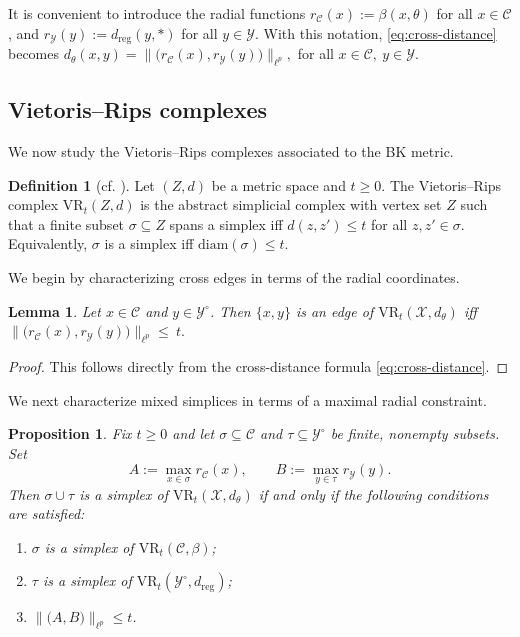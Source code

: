 \documentclass[11pt]{amsart}
\newtheorem{lemma}[theorem]{Lemma}
\newtheorem{proposition}[theorem]{Proposition}
\theoremstyle{definition}
\newtheorem{definition}[theorem]{Definition}
\theoremstyle{remark}
\newcommand{\1}{\mathbbm{1}}
\newcommand{\diam}{\mathrm{diam}}
\begin{document}
It is convenient to introduce the radial functions $r_{\mathcal C}(x):=\beta(x,\theta)$ for all $x\in\mathcal C$, and $r_{\mathcal Y}(y):=d_{\mathrm{reg}}(y,\ast)$ for all $y\in\mathcal Y.$ 
With this notation, \eqref{eq:cross-distance} becomes
$d_\theta(x,y)=\bigl\|\bigl(r_{\mathcal C}(x), r_{\mathcal Y}(y)\bigr)\bigr\|_{\ell^p},$ for all $ x\in\mathcal C,\ y\in\mathcal Y.$

\subsection{Vietoris--Rips complexes}
We now study the Vietoris--Rips complexes associated to the BK metric.
\begin{definition}[cf. {\cite{Hausmann}\cite{Gromov}}]
Let $(Z,d)$ be a metric space and $t\ge 0$.
The Vietoris--Rips complex $\mathrm{VR}_t(Z,d)$ is the abstract simplicial complex with vertex set $Z$
such that a finite subset $\sigma\subseteq Z$ spans a simplex iff $d(z,z')\le t$ for all $z,z'\in\sigma.$
Equivalently, $\sigma$ is a simplex iff $\diam(\sigma)\le t$.
\end{definition}
We begin by characterizing cross edges in terms of the radial coordinates.
\begin{lemma}
\label{lem:cross-edge}
Let $x\in\mathcal C$ and $y\in \mathcal Y^\circ$. Then $\{x,y\}$ is an edge of $\mathrm{VR}_t(\mathcal X,d_\theta)$ iff $\bigl\|\bigl(r_{\mathcal C}(x), r_{\mathcal Y}(y)\bigr)\bigr\|_{\ell^p}
\le\ t.$
\end{lemma}

\begin{proof}This follows directly from the cross-distance formula \eqref{eq:cross-distance}.
\end{proof}
We next characterize mixed simplices in terms of a maximal radial constraint.
\begin{proposition}
\label{prop:rips-mixed}
Fix $t\ge 0$ and let $\sigma\subseteq\mathcal C$ and $\tau\subseteq\mathcal Y^\circ$ be finite, nonempty subsets.
Set
\[
A:=\max_{x\in\sigma} r_{\mathcal C}(x),
\qquad
B:=\max_{y\in\tau} r_{\mathcal Y}(y).
\]
Then $\sigma\cup\tau$ is a simplex of $\mathrm{VR}_t(\mathcal X,d_\theta)$ if and only if the following conditions are satisfied:
\begin{enumerate}
\item $\sigma$ is a simplex of $\mathrm{VR}_t(\mathcal C,\beta)$;
\item $\tau$ is a simplex of $\mathrm{VR}_t(\mathcal Y^\circ,d_{\mathrm{reg}})$;
\item $\bigl\|\bigl(A, B\bigr)\bigr\|_{\ell^p}\le t$.
\end{enumerate}
\end{proposition}
\end{document}

